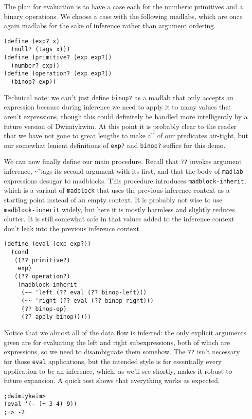 \documentclass[11pt]{article}
\begin{document}
The plan for evaluation is to have a case each
for the numberic primitives and a binary operations.
We choose a case with the following madlabs,
which are once again madlabs for the sake of inference
rather than argument ordering.
\begin{Verbatim}
(define (exp? x)
  (null? (tags x)))
(define (primitive? (exp exp?))
  (number? exp))
(define (operation? (exp exp?))
  (binop? exp))
\end{Verbatim}
Technical note: we can't just define \texttt{binop?} as a madlab
that only accepts an expression
because during inference we need to apply it
to many values that aren't expressions,
though this could definitely be handled more intelligently
by a future version of Dwimiykwim.
At this point it is probably clear to the reader that
we have not gone to great lengths to make all of our predicates air-tight,
but our somewhat lenient definitions of \texttt{exp?} and \texttt{binop?}
suffice for this demo.

We can now finally define our main procedure.
Recall that \texttt{??} invokes argument inference,
\texttt{\~\~} tags its second argument with its first,
and that the body of \texttt{madlab} expressions
desugar to madblocks.
This procedure introduces \texttt{madblock-inherit},
which is a variant of \texttt{madblock} that
uses the previous inference context as a starting point
instead of an empty context.
It is probably not wise to use \texttt{madblock-inherit} widely,
but here it is mostly harmless and slightly reduces clutter.
It is still somewhat safe in that values added to the inference context
don't leak into the previous inference context.
\begin{Verbatim}
(define (eval (exp exp?))
  (cond
   ((?? primitive?)
    exp)
   ((?? operation?)
    (madblock-inherit
     (~~ 'left (?? eval (?? binop-left)))
     (~~ 'right (?? eval (?? binop-right)))
     (?? binop-op)
     (?? apply-binop)))))
\end{Verbatim}
Notice that we almost all of the data flow is inferred:
the only explicit arguments given are for evaluating
the left and right subexpressions,
both of which are expressions, so we need to disambiguate them somehow.
The \texttt{??} isn't necessary for those \texttt{eval} applications,
but the intended style is for essentially every application
to be an inference,
which, as we'll see shortly, makes it robust to future expansion.
A quick test shows that everything works as expected.
\begin{Verbatim}
;dwimiykwim>
(eval '(- (+ 3 4) 9))
;=> -2
\end{Verbatim}
\end{document}
